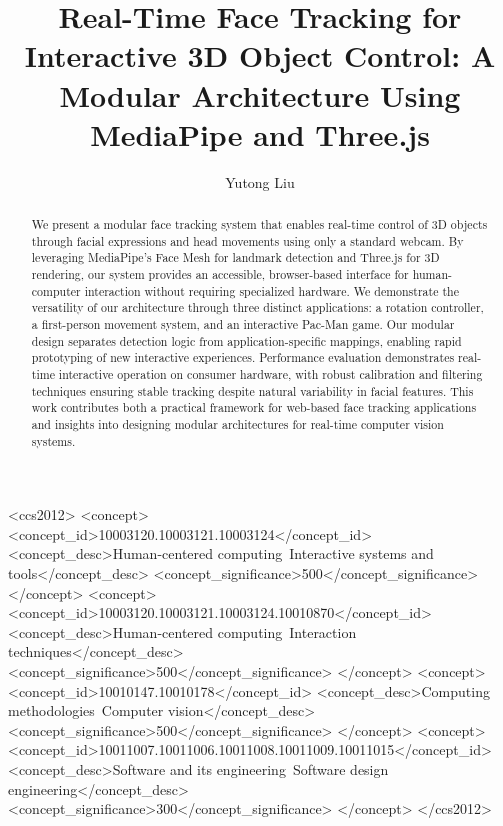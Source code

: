 \documentclass[sigconf]{acmart}
\begin{document}
\title{Real-Time Face Tracking for Interactive 3D Object Control: A Modular Architecture Using MediaPipe and Three.js}

\author{Yutong Liu}

\begin{abstract}
We present a modular face tracking system that enables real-time control of 3D objects through facial expressions and head movements using only a standard webcam. By leveraging MediaPipe's Face Mesh for landmark detection and Three.js for 3D rendering, our system provides an accessible, browser-based interface for human-computer interaction without requiring specialized hardware. We demonstrate the versatility of our architecture through three distinct applications: a rotation controller, a first-person movement system, and an interactive Pac-Man game. Our modular design separates detection logic from application-specific mappings, enabling rapid prototyping of new interactive experiences. Performance evaluation demonstrates real-time interactive operation on consumer hardware, with robust calibration and filtering techniques ensuring stable tracking despite natural variability in facial features. This work contributes both a practical framework for web-based face tracking applications and insights into designing modular architectures for real-time computer vision systems.
\end{abstract}

\begin{CCSXML}
<ccs2012>
<concept>
<concept_id>10003120.10003121.10003124</concept_id>
<concept_desc>Human-centered computing~Interactive systems and tools</concept_desc>
<concept_significance>500</concept_significance>
</concept>
<concept>
<concept_id>10003120.10003121.10003124.10010870</concept_id>
<concept_desc>Human-centered computing~Interaction techniques</concept_desc>
<concept_significance>500</concept_significance>
</concept>
<concept>
<concept_id>10010147.10010178</concept_id>
<concept_desc>Computing methodologies~Computer vision</concept_desc>
<concept_significance>500</concept_significance>
</concept>
<concept>
<concept_id>10011007.10011006.10011008.10011009.10011015</concept_id>
<concept_desc>Software and its engineering~Software design engineering</concept_desc>
<concept_significance>300</concept_significance>
</concept>
</ccs2012>
\end{CCSXML}

\end{document}
